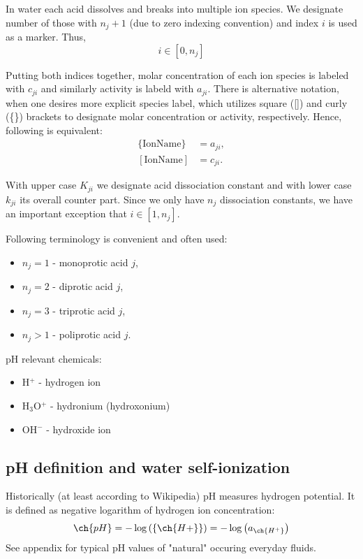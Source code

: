 In water each acid dissolves and breaks into multiple ion species. We designate number of those with $n_j + 1$ (due to zero indexing convention) and index $i$ is used as a marker. Thus,
\[i \in [0, n_j]\]

Putting both indices together, molar concentration of each ion species is labeled with $c_{ji}$ and similarly activity is labeld with $a_{ji}$. There is alternative notation, when one desires more explicit species label, which utilizes square ([]) and curly (\{\}) brackets to designate molar concentration or activity, respectively.
Hence, following is equivalent:
\begin{align}
    \{\text{IonName}\} & = a_{ji}, \\
    [\text{IonName}]   & = c_{ji}.
\end{align}

With upper case $K_{ji}$ we designate acid dissociation constant and with lower case $k_{ji}$ its
overall counter part. Since we only have $n_j$ dissociation constants, we have an important exception
that $i \in [1, n_j]$.

Following terminology is convenient and often used:
\begin{itemize}
    \item $n_j=1$ - monoprotic acid $j$,
    \item $n_j=2$ - diprotic acid $j$,
    \item $n_j=3$ - triprotic acid $j$,
    \item $n_j>1$ - poliprotic acid $j$.
\end{itemize}

pH relevant chemicals:
\begin{itemize}
    \item H$^{+}$ - hydrogen ion
    \item H$_3$O$^{+}$ - hydronium (hydroxonium)
    \item OH$^{-}$ - hydroxide ion
\end{itemize}



\subsection{pH definition and water self-ionization}

\noindent
Historically (at least according to Wikipedia) pH measures hydrogen potential. It is defined as negative logarithm of hydrogen ion concentration:
\begin{equation}\label{eq:phDef}
    \ch{pH} = -\log \left(\left\{\ch{H+}\right\}\right) = -\log\left(a_{\ch{H^+}}\right)
\end{equation}
See appendix for typical pH values of "natural" occuring everyday fluids.

